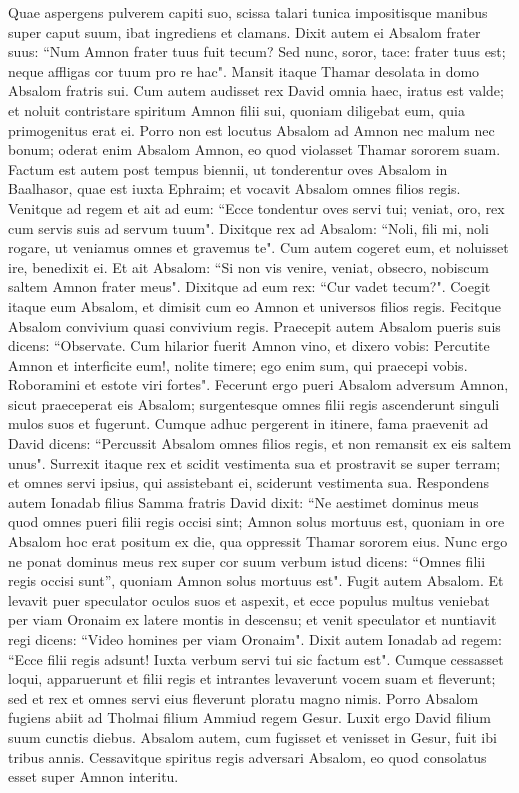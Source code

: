 \begin{biblechapter}
\verse Quae aspergens pulverem capiti suo, scissa talari tunica impositisque manibus super caput suum, ibat ingrediens et clamans. 
\verse Dixit autem ei Absalom frater suus: “Num Amnon frater tuus fuit tecum? Sed nunc, soror, tace: frater tuus est; neque affligas cor tuum pro re hac". Mansit itaque Thamar desolata in domo Absalom fratris sui. 
\verse Cum autem audisset rex David omnia haec, iratus est valde; et noluit contristare spiritum Amnon filii sui, quoniam diligebat eum, quia primogenitus erat ei. 
\verse Porro non est locutus Absalom ad Amnon nec malum nec bonum; oderat enim Absalom Amnon, eo quod violasset Thamar sororem suam. 
\verse Factum est autem post tempus biennii, ut tonderentur oves Absalom in Baalhasor, quae est iuxta Ephraim; et vocavit Absalom omnes filios regis. 
\verse Venitque ad regem et ait ad eum: “Ecce tondentur oves servi tui; veniat, oro, rex cum servis suis ad servum tuum". 
\verse Dixitque rex ad Absalom: “Noli, fili mi, noli rogare, ut veniamus omnes et gravemus te". Cum autem cogeret eum, et noluisset ire, benedixit ei. 
\verse Et ait Absalom: “Si non vis venire, veniat, obsecro, nobiscum saltem Amnon frater meus". Dixitque ad eum rex: “Cur vadet tecum?". 
\verse Coegit itaque eum Absalom, et dimisit cum eo Amnon et universos filios regis. Fecitque Absalom convivium quasi convivium regis. 
\verse Praecepit autem Absalom pueris suis dicens: “Observate. Cum hilarior fuerit Amnon vino, et dixero vobis: Percutite Amnon et interficite eum!, nolite timere; ego enim sum, qui praecepi vobis. Roboramini et estote viri fortes". 
\verse Fecerunt ergo pueri Absalom adversum Amnon, sicut praeceperat eis Absalom; surgentesque omnes filii regis ascenderunt singuli mulos suos et fugerunt. 
\verse Cumque adhuc pergerent in itinere, fama praevenit ad David dicens: “Percussit Absalom omnes filios regis, et non remansit ex eis saltem unus".  
\verse Surrexit itaque rex et scidit vestimenta sua et prostravit se super terram; et omnes servi ipsius, qui assistebant ei, sciderunt vestimenta sua. 
\verse Respondens autem Ionadab filius Samma fratris David dixit: “Ne aestimet dominus meus quod omnes pueri filii regis occisi sint; Amnon solus mortuus est, quoniam in ore Absalom hoc erat positum ex die, qua oppressit Thamar sororem eius.  
\verse Nunc ergo ne ponat dominus meus rex super cor suum verbum istud dicens: “Omnes filii regis occisi sunt”, quoniam Amnon solus mortuus est". 
\verse Fugit autem Absalom. Et levavit puer speculator oculos suos et aspexit, et ecce populus multus veniebat per viam Oronaim ex latere montis in descensu; et venit speculator et nuntiavit regi dicens: “Video homines per viam Oronaim". 
\verse Dixit autem Ionadab ad regem: “Ecce filii regis adsunt! Iuxta verbum servi tui sic factum est". 
\verse Cumque cessasset loqui, apparuerunt et filii regis et intrantes levaverunt vocem suam et fleverunt; sed et rex et omnes servi eius fleverunt ploratu magno nimis. 
\verse Porro Absalom fugiens abiit ad Tholmai filium Ammiud regem Gesur. Luxit ergo David filium suum cunctis diebus. 
\verse Absalom autem, cum fugisset et venisset in Gesur, fuit ibi tribus annis. 
\verse Cessavitque spiritus regis adversari Absalom, eo quod consolatus esset super Amnon interitu. 
\end{biblechapter}


